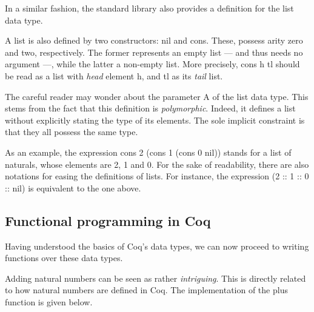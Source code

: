 			
	
	In a similar fashion, the standard library also provides a definition for the list data type.	
	
	

	\noindent A \textsf{list} is also defined by two constructors: \textsf{nil} and \textsf{cons}. These,
	possess arity zero and two, respectively.
	The former represents an empty list --- and thus needs no argument ---, 
	while the latter a non-empty list. More precisely, \textsf{cons h tl} should be read
	as a \textsf{list} with \textit{head} element \textsf{h}, 
	and \textsf{tl} as its \textit{tail} \textsf{list}.
	
	The careful reader may wonder about the parameter \textsf{A} of the \textsf{list} data type. This
	stems from the fact that this definition is \textit{polymorphic}. Indeed, it defines a list without 
	explicitly stating the type of its elements. The sole implicit constraint is that they all possess
	the same type.
	
		As an example, the expression \textsf{cons 2 (cons 1 (cons 0 nil))} stands for a list
	of naturals, whose elements are 2, 1 and 0. For the sake of readability, there are also
	notations for easing the definitions of lists. For instance, the expression \textsf{(2 :: 1 :: 0 :: nil)} is
	equivalent to the one above.	


\subsection{Functional programming in Coq}
\label{sub:fpcoq}

	Having understood the basics of Coq's data types, we can now proceed to writing functions over
	these data types. 
	
	Adding natural numbers can be seen as rather \textit{intriguing}. This is directly
	related to how natural numbers are defined in Coq. The implementation of 
	the \textsf{plus} function is given below.
	
			
	
